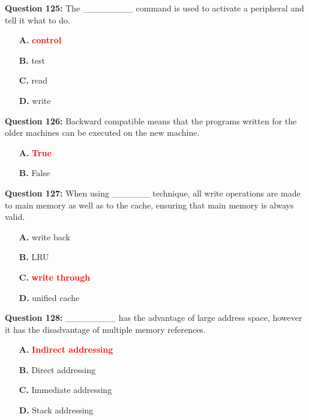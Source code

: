 \documentclass[12pt,a4paper]{article}
\begin{document}
\vspace{0.5cm}

\textbf{Question 125:} The ________ command is used to activate a peripheral and tell it what to do.

\begin{itemize}
    \item[\textbf{A.}] \textcolor{red}{\textbf{control}}
    \item[\textbf{B.}] test
    \item[\textbf{C.}] read
    \item[\textbf{D.}] write
\end{itemize}

\vspace{0.5cm}

\textbf{Question 126:} Backward compatible means that the programs written for the older machines can be executed on the new machine.

\begin{itemize}
    \item[\textbf{A.}] \textcolor{red}{\textbf{True}}
    \item[\textbf{B.}] False
\end{itemize}

\vspace{0.5cm}

\textbf{Question 127:} When using ______ technique, all write operations are made to main memory as well as to the cache, ensuring that main memory is always valid.

\begin{itemize}
    \item[\textbf{A.}] write back
    \item[\textbf{B.}] LRU
    \item[\textbf{C.}] \textcolor{red}{\textbf{write through}}
    \item[\textbf{D.}] unified cache
\end{itemize}

\vspace{0.5cm}

\textbf{Question 128:} ________ has the advantage of large address space, however it has the disadvantage of multiple memory references.

\begin{itemize}
    \item[\textbf{A.}] \textcolor{red}{\textbf{Indirect addressing}}
    \item[\textbf{B.}] Direct addressing
    \item[\textbf{C.}] Immediate addressing
    \item[\textbf{D.}] Stack addressing
\end{itemize}
\end{document}
